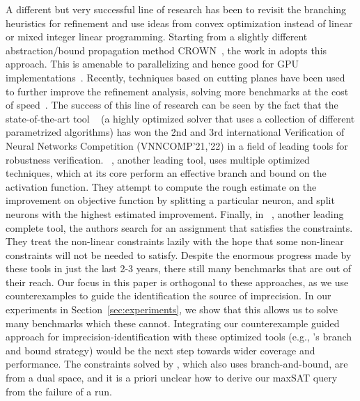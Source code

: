 

\medskip

{A different but very successful line of research has been to revisit the branching heuristics for refinement and 
use ideas from convex optimization instead of linear or mixed integer linear programming. Starting from a slightly 
different abstraction/bound propagation method CROWN~\cite{zhang2018efficient}, the work in \cite{wang2021beta} 
adopts this approach. This is amenable to parallelizing and hence good for GPU implementations~\cite{xu2020fast}. 
Recently, techniques based on cutting planes have been used to further improve the refinement analysis, solving more benchmarks 
at the cost of speed~\cite{zhang2022general}. The success of this line of research can be seen by the fact that the 
state-of-the-art tool \alphabeta{}~\cite{alphabetacrown} (a highly optimized solver that uses a collection of different 
parametrized algorithms) has won the 2nd and 3rd international Verification of Neural Networks Competition (VNNCOMP'21,'22) 
in a field of leading tools for robustness verification. \ovaltool{}~\cite{bunel2020branch}, 
another leading tool, uses multiple optimized techniques, which at its core perform an effective branch and bound on 
the \relu{} activation function. They attempt to compute the rough estimate on the improvement on objective function by 
splitting a particular neuron, and split neurons with the highest estimated improvement. 
Finally, in \marabou{}~\cite{katz2019marabou}, another leading complete tool, the authors search for an assignment that 
satisfies the constraints. They treat the non-linear constraints lazily with the hope that some non-linear constraints 
will not be needed to satisfy. Despite the enormous progress made by these tools in just the last 2-3 years, 
there still many benchmarks that are out of their reach. %
Our focus in this paper is orthogonal to these approaches, as we use counterexamples to guide the identification 
the source of imprecision. In our experiments in Section~\ref{sec:experiments}, 
we show that this allows us to solve many benchmarks which these cannot. 
Integrating our counterexample guided approach for imprecision-identification with these optimized 
tools (e.g., \alphabeta{}'s branch and bound strategy) would be the next step 
towards wider coverage and performance. The constraints solved by 
\alphabeta{}, which also uses branch-and-bound, are from a dual space, and it is a priori unclear how to derive 
our maxSAT query from the failure of a run.

}

